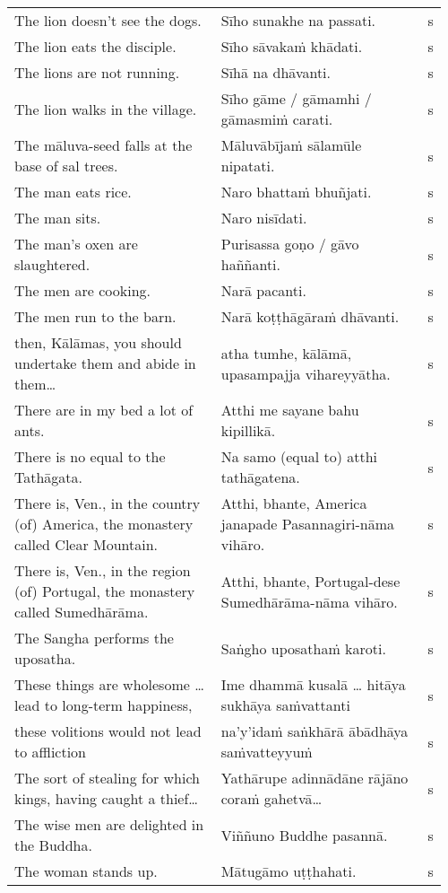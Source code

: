 \documentclass[a5paper]{memoir}
\begin{document}
\begin{longtable}{L{0.48\linewidth} L{0.48\linewidth} H}
The lion doesn't see the dogs. & Sīho sunakhe na passati. & s\\[0pt]
The lion eats the disciple. & Sīho sāvakaṁ khādati. & s\\[0pt]
The lions are not running. & Sīhā na dhāvanti. & s\\[0pt]
The lion walks in the village. & Sīho gāme / gāmamhi / gāmasmiṁ carati. & s\\[0pt]
The māluva-seed falls at the base of sal trees. & Māluvābījaṁ sālamūle nipatati. & s\\[0pt]
The man eats rice. & Naro bhattaṁ bhuñjati. & s\\[0pt]
The man sits. & Naro nisīdati. & s\\[0pt]
The man's oxen are slaughtered. & Purisassa goṇo / gāvo haññanti. & s\\[0pt]
The men are cooking. & Narā pacanti. & s\\[0pt]
The men run to the barn. & Narā koṭṭhāgāraṁ dhāvanti. & s\\[0pt]
then, Kālāmas, you should undertake them and abide in them\ldots{} & atha tumhe, kālāmā, upasampajja vihareyyātha. & s\\[0pt]
There are in my bed a lot of ants. & Atthi me sayane bahu kipillikā. & s\\[0pt]
There is no equal to the Tathāgata. & Na samo (equal to) atthi tathāgatena. & s\\[0pt]
There is, Ven., in the country (of) America, the monastery called Clear Mountain. & Atthi, bhante, America janapade Pasannagiri-nāma vihāro. & s\\[0pt]
There is, Ven., in the region (of) Portugal, the monastery called Sumedhārāma. & Atthi, bhante, Portugal-dese Sumedhārāma-nāma vihāro. & s\\[0pt]
The Sangha performs the uposatha. & Saṅgho uposathaṁ karoti. & s\\[0pt]
These things are wholesome \ldots{} lead to long-term happiness, & Ime dhammā kusalā \ldots{} hitāya sukhāya saṁvattanti & s\\[0pt]
these volitions would not lead to affliction & na'y'idaṁ saṅkhārā ābādhāya saṁvatteyyuṁ & s\\[0pt]
The sort of stealing for which kings, having caught a thief\ldots{} & Yathārupe adinnādāne rājāno coraṁ gahetvā\ldots{} & s\\[0pt]
The wise men are delighted in the Buddha. & Viññuno Buddhe pasannā. & s\\[0pt]
The woman stands up. & Mātugāmo uṭṭhahati. & s\\[0pt]

\end{longtable}
\end{document}
